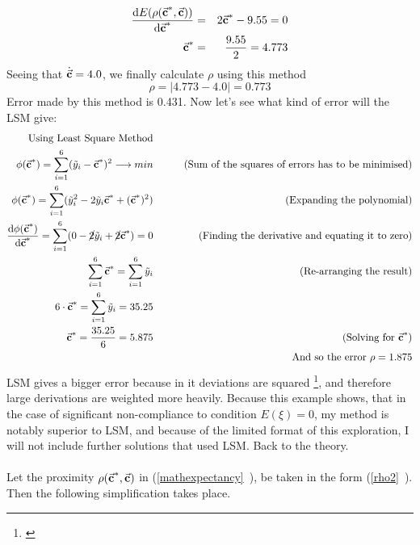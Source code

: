 \begin{eqnarray*}
\frac{\mathrm{d}E(\rho(\vec{\textbf{c}}^{*},\vec{\textbf{c}}))}{\mathrm{d}\vec{\textbf{c}}^{*}} &=& 2\vec{\textbf{c}}^{*}-9.55 = 0 \\
\vec{\textbf{c}}^{*} &=& \frac{9.55}{2} = 4.773
\end{eqnarray*}
Seeing that $\dot{\vec{\textbf{c}}} = 4.0$, we finally calculate $\rho$ using this method
\begin{equation*}
\rho = |4.773-4.0| = 0.773
\end{equation*}
Error made by this method is 0.431. Now let's see what kind of error will the LSM give:
\begin{eqnarray*}
\text{Using Least Square Method} \\
\phi(\vec{\textbf{c}}^{*})= \sum\limits_{i=1}^{6}(\tilde{y}_{i}-\vec{\textbf{c}}^{*})^{2} \longrightarrow min &\qquad & \text{(Sum of the squares of errors has to be minimised)}\\
\phi(\vec{\textbf{c}}^{*})= \sum\limits_{i=1}^{6}(\tilde{y}_{i}^{2}-2 \tilde{y}_{i}\vec{\textbf{c}}^{*} + (\vec{\textbf{c}}^{*})^{2}) &\qquad & \text{(Expanding the polynomial)}\\
\frac{\mathrm{d}\phi(\vec{\textbf{c}}^{*})}{\mathrm{d}\vec{\textbf{c}}^{*}} =  \sum\limits_{i=1}^{6}(0 -\cancel{2} \tilde{y}_{i} +\cancel{2} \vec{\textbf{c}}^{*}) = 0  &\qquad & \text{(Finding the derivative and equating it to zero)}\\
 \sum\limits_{i=1}^{6}\vec{\textbf{c}}^{*} = \sum\limits_{i=1}^{6} \tilde{y}_{i} &\qquad & \text{(Re-arranging the result)}\\
 6 \cdot \vec{\textbf{c}}^{*} = \sum\limits_{i=1}^{6} \tilde{y}_{i} = 35.25 &\qquad & \\
 \vec{\textbf{c}}^{*} = \frac{35.25}{6} = 5.875 &\qquad & \text{(Solving for $\vec{\textbf{c}}^{*}$)}\\
& \qquad & \text{And so the error } \rho = 1.875
\end{eqnarray*}
LSM gives a bigger error because in it deviations are squared \footnote{\cite{Plackett_1950}}, and therefore large derivations are weighted more heavily. Because this example shows, that in the case of significant non-compliance to condition $E(\xi)=0$, my method is notably superior to LSM, and because of the limited format of this exploration, I will not include further solutions that used LSM. %
 Back to the theory.\\
\\
Let the proximity $\rho(\vec{\textbf{c}}^{*},\vec{\textbf{c}})$ in (\vref{mathexpectancy}~), be taken in the form (\vref{rho2}~). Then the following simplification takes place.
